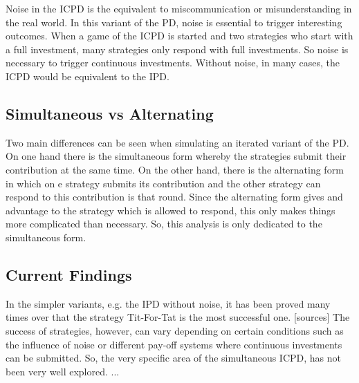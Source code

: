 \documentclass{article}
\begin{document}
Noise in the ICPD is the equivalent to miscommunication or misunderstanding in the real world.
In this variant of the PD, noise is essential to trigger interesting outcomes.
When a game of the ICPD is started and two strategies who start with a full investment, many strategies only respond with full investments.
So noise is necessary to trigger continuous investments. 
Without noise, in many cases, the ICPD would be equivalent to the IPD.


\subsection{Simultaneous vs Alternating}

Two main differences can be seen when simulating an iterated variant of the PD.
On one hand there is the simultaneous form whereby the strategies submit their contribution at the same time.
On the other hand, there is the alternating form in which on e strategy submits its contribution and the other strategy can respond to this contribution is that round.
Since the alternating form gives and advantage to the strategy which is allowed to respond, this only makes things more complicated than necessary.
So, this analysis is only dedicated to the simultaneous form.

\subsection{Current Findings}

In the simpler variants, e.g. the IPD without noise, it has been proved many times over that the strategy Tit-For-Tat is the most successful one. [sources]
The success of strategies, however, can vary depending on certain conditions such as the influence of noise or different pay-off systems where continuous investments can be submitted.
So, the very specific area of the simultaneous ICPD, has not been very well explored.
...

\end{document}

